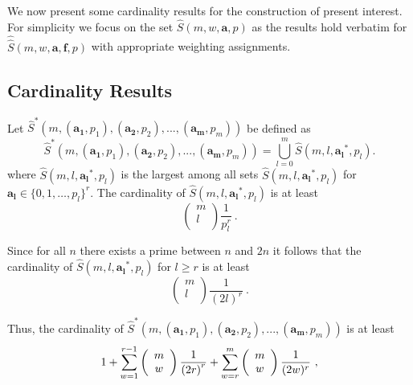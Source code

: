 \documentclass[12pt]{article} \pagestyle{plain} \topmargin
\begin{document}
We now present some cardinality results for the construction of
present interest. For simplicity we focus on the set
$\hat{S}(m,w,\mathbf{a},p)$ as the results hold verbatim for
$\hat{\hat{S}}(m,w,\mathbf{a},\mathbf{f}, p)$ with appropriate
weighting assignments.
\subsection{Cardinality Results}

 Let
$\hat{S}^*\left(m,(\mathbf{a_1},p_1),(\mathbf{a_2},p_2),...,(\mathbf{a_m},p_m)\right)$
be defined as
\begin{equation}\label{union}\hat{S}^*\left(m,(\mathbf{a_1},p_1),(\mathbf{a_2},p_2),...,(\mathbf{a_m},p_m)\right)=
\bigcup_{l=0}^{m} \hat{S}(m,l,\mathbf{a_l}^*,p_l).\end{equation}
where $\hat{S}(m,l,\mathbf{a_l}^*,p_l)$ is the largest among all
sets $\hat{S}(m,l,\mathbf{a_l}^*,p_l)$ for $\mathbf{a_l} \in
\{0,1,\dots,p_l\}^r$. The cardinality of
$\hat{S}(m,l,\mathbf{a_l}^*,p_l)$ is at least \[ \left(
\begin{array}{c}
                             m \\
                             l \\
                           \end{array}
                           \right) \frac{1}{p_l^r}~.\]

Since for all $n$ there exists a prime between $n$ and $2n$ it
follows that the cardinality of $\hat{S}(m,l,\mathbf{a_l}^*,p_l)$
for $l\geq r$ is at least \[ \left(
\begin{array}{c}
                             m \\
                             l \\
                           \end{array}
                           \right) \frac{1}{(2l)^r}~.\]

Thus, the cardinality of
$\hat{S}^*\left(m,(\mathbf{a_1},p_1),(\mathbf{a_2},p_2),...,(\mathbf{a_m},p_m)\right)$
is at least
\begin{equation}\label{up1}1+\sum_{w=1}^{r-1} \left(
\begin{array}{c}
                            m \\
                             w \\
                           \end{array}
                           \right) {\large \frac{1}{\left(2r\right)^r}} +\sum_{w=r}^m \left(
\begin{array}{c}
                            m \\
                             w \\
                           \end{array}
                           \right) \frac{1}{(2w)^r}~,
\end{equation}
\end{document}
